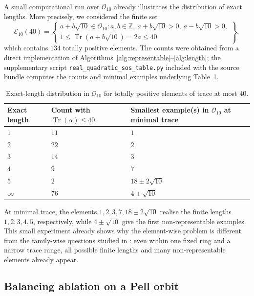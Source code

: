 \documentclass[manuscript,screen]{acmart}
\renewcommand{\le}{\leqslant}
\theoremstyle{plain}
\theoremstyle{definition}
\theoremstyle{nonitalicremark}
\newcommand{\Z}{\mathbb{Z}}
\newcommand{\OO}{\mathcal{O}}
\newcommand{\Tr}{\operatorname{Tr}}
\begin{document}
A small computational run over $\OO_{10}$ already illustrates the distribution of exact lengths.
More precisely, we considered the finite set
\[
\mathcal E_{10}(40)=
\left\{
\begin{array}{c}
a+b\sqrt{10}\in \OO_{10} : a,b\in\Z,\ a+b\sqrt{10}>0,\ a-b\sqrt{10}>0,\\
1\le \Tr(a+b\sqrt{10})=2a\le 40
\end{array}
\right\},
\]
which contains $134$ totally positive elements. The counts were obtained from a direct
implementation of Algorithms~\ref{alg:representable}--\ref{alg:length}; the supplementary script
\texttt{real\_quadratic\_sos\_table.py} included with the source bundle computes the
counts and minimal examples underlying Table~\ref{tab:data10}.

\begin{table}[tbp]
\centering
\renewcommand{\arraystretch}{1.15}
\begin{tabularx}{0.95\textwidth}{>{\centering\arraybackslash}p{} >{\centering\arraybackslash}p{} X}
\toprule
Exact length & Count with $\Tr(\alpha)\le 40$ & Smallest example(s) in $\OO_{10}$ at minimal trace \\
\midrule
$1$ & $11$ & $1$ \\
$2$ & $22$ & $2$ \\
$3$ & $14$ & $3$ \\
$4$ & $9$ & $7$ \\
$5$ & $2$ & $18\pm 2\sqrt{10}$ \\
$\infty$ & $76$ & $4\pm \sqrt{10}$ \\
\bottomrule
\end{tabularx}
\caption{Exact-length distribution in $\OO_{10}$ for totally positive elements of trace at most $40$.}
\label{tab:data10}
\end{table}

At minimal trace, the elements
$1,2,3,7,18\pm2\sqrt{10}$ realise the finite lengths $1,2,3,4,5$, respectively, while
$4\pm\sqrt{10}$ give the first non-representable examples.
This small experiment already shows why the element-wise problem is different from the family-wise
questions studied in \cite{KY,Raska}: even within one fixed ring and a narrow trace range,
all possible finite lengths and many non-representable elements already appear.

\subsection*{Balancing ablation on a Pell orbit}
\end{document}
